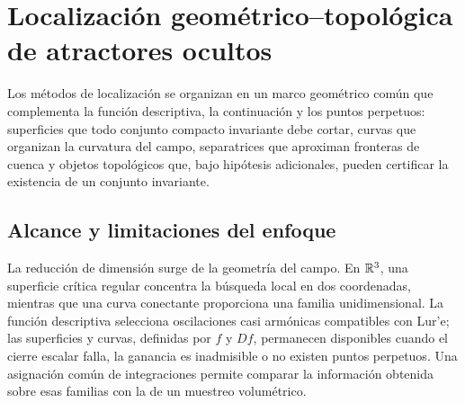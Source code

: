 \section{Localización geométrico--topológica de atractores ocultos}
\label{sec:localizacion-geometrico-topologica}

\HAFOCardGeometric

Los métodos de localización se organizan en un marco geométrico común que
complementa la función descriptiva, la continuación y los puntos perpetuos:
superficies que todo conjunto compacto invariante debe cortar, curvas que
organizan la curvatura del campo, separatrices que aproximan fronteras de
cuenca y objetos topológicos que, bajo hipótesis adicionales, pueden
certificar la existencia de un conjunto invariante.

\begin{center}
\end{center}

\subsection{Alcance y limitaciones del enfoque}
\label{subsec:gt-ventajas}

La reducción de dimensión surge de la geometría del campo. En \(\mathbb{R}^3\),
una superficie crítica regular concentra la búsqueda local en dos
coordenadas, mientras que una curva conectante proporciona una familia
unidimensional. La función descriptiva selecciona oscilaciones casi
armónicas compatibles con Lur'e; las superficies y curvas, definidas por
\(f\) y \(Df\), permanecen disponibles cuando el cierre escalar falla,
la ganancia es inadmisible o no existen puntos perpetuos. Una asignación
común de integraciones permite comparar la información obtenida sobre esas
familias con la de un muestreo volumétrico.

